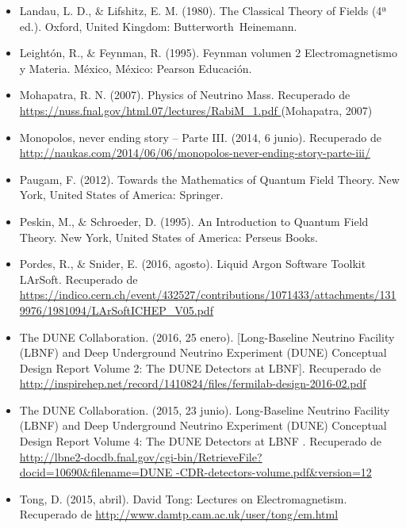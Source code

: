 \documentclass[paper=a4paper, fontsize=12pt]{scrartcl} %
\numberwithin{equation}{section} %
\numberwithin{figure}{section} %
\numberwithin{table}{section} %
\begin{document}
\begin{itemize}
\item Landau, L. D., $\&$ Lifshitz, E. M. (1980). The Classical Theory of Fields (4ª ed.). Oxford, United Kingdom: Butterworth~Heinemann.

\item Leightón, R., $\&$ Feynman, R. (1995). Feynman volumen 2 Electromagnetismo y Materia. México, México: Pearson Educación.  

\item Mohapatra, R. N. (2007). Physics of Neutrino Mass. Recuperado de \url{https://nuss.fnal.gov/html.07/lectures/RabiM_1.pdf }  (Mohapatra, 2007)

\item Monopolos, never ending story – Parte III. (2014, 6 junio).  Recuperado de \url{http://naukas.com/2014/06/06/monopolos-never-ending-story-parte-iii/ } 
\item Paugam, F. (2012). Towards the Mathematics of Quantum Field Theory. New York, United States of America: Springer.

\item Peskin, M., $\&$ Schroeder, D. (1995). An Introduction to Quantum Field Theory. New York, United States of America: Perseus Books.
\item  Pordes, R., $\&$ Snider, E. (2016, agosto). Liquid Argon Software Toolkit LArSoft. Recuperado de \url{https://indico.cern.ch/event/432527/contributions/1071433/attachments/1319976/1981094/LArSoftICHEP_V05.pdf} 

\item The DUNE Collaboration. (2016, 25 enero). [Long-Baseline Neutrino Facility (LBNF) and Deep Underground Neutrino Experiment (DUNE) Conceptual Design Report Volume 2: The DUNE Detectors at LBNF]. Recuperado de \url{http://inspirehep.net/record/1410824/files/fermilab-design-2016-02.pdf } 

\item The DUNE Collaboration. (2015, 23 junio). Long-Baseline Neutrino Facility (LBNF) and Deep Underground Neutrino Experiment (DUNE) Conceptual Design Report Volume 4: The DUNE Detectors at LBNF .                     
\newline
 Recuperado de  \url{http://lbne2-docdb.fnal.gov/cgi-bin/RetrieveFile?docid=10690&filename=DUNE  


-CDR-detectors-volume.pdf&version=12}
\item Tong, D. (2015, abril). David Tong: Lectures on Electromagnetism. Recuperado de \url{ http://www.damtp.cam.ac.uk/user/tong/em.html}


\end{itemize}
\end{document}
